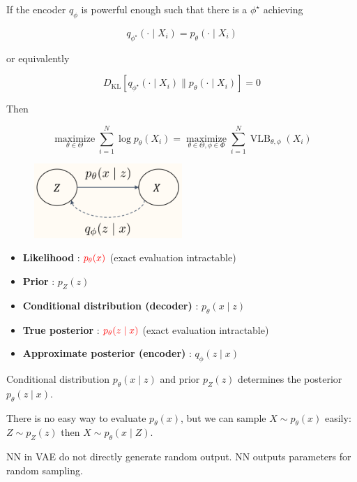 \documentclass{report}
\begin{document}
\begin{concept}
    If the encoder $q_{\phi}$ is powerful enough such that there is a $\phi^{\star}$ achieving

    $$
    q_{\phi^{\star}}\left(\cdot \mid X_{i}\right)=p_{\theta}\left(\cdot \mid X_{i}\right)
    $$

    or equivalently

    $$
    D_{\mathrm{KL}}\left[q_{\phi^{\star}}\left(\cdot \mid X_{i}\right) \| p_{\theta}\left(\cdot \mid X_{i}\right)\right]=0
    $$

    Then

    $$
    \underset{\theta \in \Theta}{\operatorname{maximize}} \sum_{i=1}^{N} \log p_{\theta}\left(X_{i}\right)=\underset{\theta \in \Theta, \phi \in \Phi}{\operatorname{maximize}} \sum_{i=1}^{N} \operatorname{VLB}_{\theta, \phi}\left(X_{i}\right)
    $$
\end{concept}

\begin{definition}
    \begin{figure}[H]
        \centering
        \includegraphics[width=0.5\textwidth]{.././assets/11.4.png}
    \end{figure}

    \begin{itemize}
        \item \textbf{Likelihood} : $\textcolor{red}{p_{\theta}(x)}$ (exact evaluation intractable)
        \item \textbf{Prior} : $p_{Z}(z)$
        \item \textbf{Conditional distribution (decoder)} : $p_{\theta}(x \mid z)$
        \item \textbf{True posterior} : $\textcolor{red}{p_{\theta}(z \mid x)}$ (exact evaluation intractable)
        \item \textbf{Approximate posterior (encoder)} : $q_{\phi}(z \mid x)$
    \end{itemize}

    \par\noindent\textcolor{gray}{\hdashrule{\textwidth}{0.4pt}{1pt 2pt}}

    Conditional distribution $p_{\theta}(x \mid z)$ and prior $p_{Z}(z)$ determines the posterior $p_{\theta}(z \mid x)$.

    There is no easy way to evaluate $p_{\theta}(x)$, but we can sample $X \sim p_{\theta}(x)$ easily: $Z \sim p_{Z}(z)$ then $X \sim p_{\theta}(x \mid Z)$.

    NN in VAE do not directly generate random output. NN outputs parameters for random sampling.
\end{definition}
\end{document}
